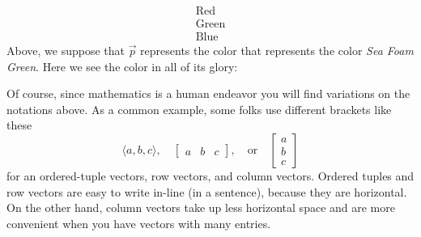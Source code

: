 \documentclass{ximera}
\begin{document}
\begin{concept}
\begin{description}
\[\begin{array}{l}
    \text{Red}\\
    \text{Green}\\
    \text{Blue}
    \end{array}
  \]
  Above, we suppose that $\vec{p}$ represents the color that
  represents the color \textit{Sea Foam Green}. Here we see the color in all of its glory:
  \begin{center}
    \colorbox[RGB]{159, 226, 191}{
      \parbox{1cm}{\rule{0pt}{1cm}}}
  \end{center}
\end{description}
\end{concept}

Of course, since mathematics is a human endeavor you will find
variations on the notations above. As a common example, some folks use
different brackets like these
\[
\langle a, b, c\rangle, \quad \begin{bmatrix} a & b & c \end{bmatrix}, \quad \text{or}\quad
\begin{bmatrix}
  a\\
  b\\
  c
\end{bmatrix}
\]
for an ordered-tuple vectors, row vectors, and column vectors. Ordered
tuples and row vectors are easy to write in-line (in a sentence),
because they are horizontal. On the other hand, column vectors take up
less horizontal space and are more convenient when you have vectors
with many entries.
\end{document}
